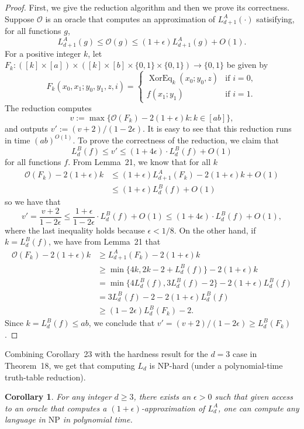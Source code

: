 \documentclass[10pt,a4paper]{article}
\newtheorem{corollary}[theorem]{Corollary}
\newcommand{\XorEq}{\operatorname{XorEq}}
\begin{document}
\begin{proof}
First, we give the reduction algorithm and then we prove its correctness. Suppose $\mathcal O$ is an oracle that computes an approximation of $L_{d+1}^A(\cdot)$ satisifying, for all functions $g$,
\[L_{d+1}^A(g)\le\mathcal O(g)\le(1+\epsilon)L_{d+1}^A(g)+O(1).\]
For a positive integer $k$, let $F_k:([k]\times[a])\times([k]\times[b]\times\{0,1\}\times\{0,1\})\to\{0,1\}$ be given by
\[F_k(x_0,x_1;y_0,y_1,z,i)=\begin{cases}\XorEq_k(x_0;y_0,z)&\text{if }i=0,\\f(x_1;y_1)&\text{if }i=1.\end{cases}\]
The reduction computes
\[v:=\max\{\mathcal O(F_k)-2(1+\epsilon)k:k\in[ab]\},\]
and outputs $v':=(v+2)/(1-2\epsilon)$. It is easy to see that this reduction runs in time $(ab)^{O(1)}$.
To prove the correctness of the reduction, we claim that
\[L_d^B(f)\le v'\le(1+4\epsilon)\cdot L_d^B(f)+O(1)\]
for all functions $f$.
From Lemma~21, we know that for all $k$
\begin{align*}
\mathcal O(F_k)-2(1+\epsilon)k
&\le(1+\epsilon)L_{d+1}^A(F_k)-2(1+\epsilon)k+O(1)\\
&\le(1+\epsilon)L_d^B(f)+O(1)
\end{align*}
so we have that
\[v'=\frac{v+2}{1-2\epsilon}\le\frac{1+\epsilon}{1-2\epsilon}\cdot L_d^B(f)+O(1)\le(1+4\epsilon)\cdot L_d^B(f)+O(1),\]
where the last inequality holds because $\epsilon<1/8$.
On the other hand, if $k=L_d^B(f)$, we have from Lemma~21 that
\begin{align*}
\mathcal O(F_k)-2(1+\epsilon)k
&\ge L_{d+1}^A(F_k)-2(1+\epsilon)k\\
&\ge\min\{4k,2k-2+L_d^B(f)\}-2(1+\epsilon)k\\
&=\min\{4L_d^B(f),3L_d^B(f)-2\}-2(1+\epsilon)L_d^B(f)\\
&=3L_d^B(f)-2-2(1+\epsilon)L_d^B(f)\\
&\ge(1-2\epsilon)L_d^B(F_k)-2.
\end{align*}
Since $k=L_d^B(f)\le ab$, we conclude that $v'=(v+2)/(1-2\epsilon)\ge L_d^B(F_k)$.
\end{proof}
Combining Corollary~23 with the hardness result for the $d=3$ case in Theorem~18, we get that computing $L_d$ is NP-hard (under a polynomial-time truth-table reduction).

\begin{corollary}
For any integer $d\ge3$, there exists an $\epsilon>0$ such that given access to an oracle that computes a $(1+\epsilon)$-approximation of $L_d^A$, one can compute any language in $\mathrm{NP}$ in polynomial time.
\end{corollary}
\end{document}

